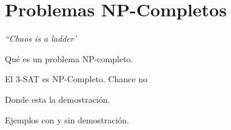 \section{Problemas NP-Completos}
\begin{flushright}
\textit{``Chaos is a ladder'}
\end{flushright}
\begin{dfn}
Qué es un problema NP-completo. 
\end{dfn}
\begin{teo}
El 3-SAT es NP-Completo. Chance no
\end{teo}
Donde esta la demostración. 

\begin{eje}
Ejemplos con y sin demostración. 
\end{eje}
